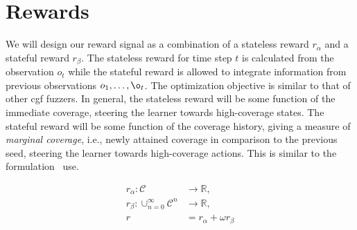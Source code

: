 \section{Rewards}

We will design our reward signal as a combination of a stateless reward $r_\alpha$
and a stateful reward $r_\beta$.
The stateless reward for time step $t$ is calculated from the observation $o_t$
while the stateful reward is allowed to integrate information from previous observations
$o_1,\dots,\o_t$.
The optimization objective is similar to that of other \gls{cgf} fuzzers.
In general, the stateless reward will be some function of the immediate coverage,
steering the learner towards high-coverage states.
The stateful reward will be some function of the coverage history, giving a measure
of \emph{marginal coverage}, i.e., newly attained coverage in comparison to the
previous seed, steering the learner towards high-coverage actions.
This is similar to the formulation~\textcite{bottinger_deep_2018} use.

\begin{align*}
  r_\alpha:\mathcal{C}&\rightarrow\mathbb{R}, \\
  r_\beta:\cup_{n=0}^{\infty}\mathcal{C}^n&\rightarrow\mathbb{R}, \\
  r&=r_\alpha+\omega r_\beta
\end{align*}


%
%
